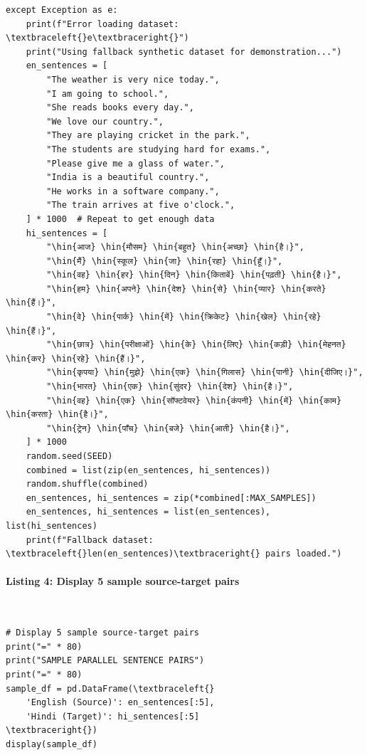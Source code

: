 \documentclass[12pt,a4paper,oneside]{report}
\newcommand{\hin}[1]{{\hinfont #1}}
\begin{document}
\begin{Verbatim}[commandchars=\\\{\},breaklines=true,breakanywhere=true,fontsize=\scriptsize,frame=leftline,framesep=2mm,rulecolor=\color{gray}]
except Exception as e:
    print(f"Error loading dataset: \textbraceleft{}e\textbraceright{}")
    print("Using fallback synthetic dataset for demonstration...")
    en_sentences = [
        "The weather is very nice today.",
        "I am going to school.",
        "She reads books every day.",
        "We love our country.",
        "They are playing cricket in the park.",
        "The students are studying hard for exams.",
        "Please give me a glass of water.",
        "India is a beautiful country.",
        "He works in a software company.",
        "The train arrives at five o'clock.",
    ] * 1000  # Repeat to get enough data
    hi_sentences = [
        "\hin{आज} \hin{मौसम} \hin{बहुत} \hin{अच्छा} \hin{है।}",
        "\hin{मैं} \hin{स्कूल} \hin{जा} \hin{रहा} \hin{हूँ।}",
        "\hin{वह} \hin{हर} \hin{दिन} \hin{किताबें} \hin{पढ़ती} \hin{है।}",
        "\hin{हम} \hin{अपने} \hin{देश} \hin{से} \hin{प्यार} \hin{करते} \hin{हैं।}",
        "\hin{वे} \hin{पार्क} \hin{में} \hin{क्रिकेट} \hin{खेल} \hin{रहे} \hin{हैं।}",
        "\hin{छात्र} \hin{परीक्षाओं} \hin{के} \hin{लिए} \hin{कड़ी} \hin{मेहनत} \hin{कर} \hin{रहे} \hin{हैं।}",
        "\hin{कृपया} \hin{मुझे} \hin{एक} \hin{गिलास} \hin{पानी} \hin{दीजिए।}",
        "\hin{भारत} \hin{एक} \hin{सुंदर} \hin{देश} \hin{है।}",
        "\hin{वह} \hin{एक} \hin{सॉफ्टवेयर} \hin{कंपनी} \hin{में} \hin{काम} \hin{करता} \hin{है।}",
        "\hin{ट्रेन} \hin{पाँच} \hin{बजे} \hin{आती} \hin{है।}",
    ] * 1000
    random.seed(SEED)
    combined = list(zip(en_sentences, hi_sentences))
    random.shuffle(combined)
    en_sentences, hi_sentences = zip(*combined[:MAX_SAMPLES])
    en_sentences, hi_sentences = list(en_sentences), list(hi_sentences)
    print(f"Fallback dataset: \textbraceleft{}len(en_sentences)\textbraceright{} pairs loaded.")
\end{Verbatim}
\paragraph{Listing 4: Display 5 sample source-target pairs}\mbox{}\\[-1ex]
\begin{Verbatim}[commandchars=\\\{\},breaklines=true,breakanywhere=true,fontsize=\scriptsize,frame=leftline,framesep=2mm,rulecolor=\color{gray}]
# Display 5 sample source-target pairs
print("=" * 80)
print("SAMPLE PARALLEL SENTENCE PAIRS")
print("=" * 80)
sample_df = pd.DataFrame(\textbraceleft{}
    'English (Source)': en_sentences[:5],
    'Hindi (Target)': hi_sentences[:5]
\textbraceright{})
display(sample_df)
\end{Verbatim}
\end{document}
